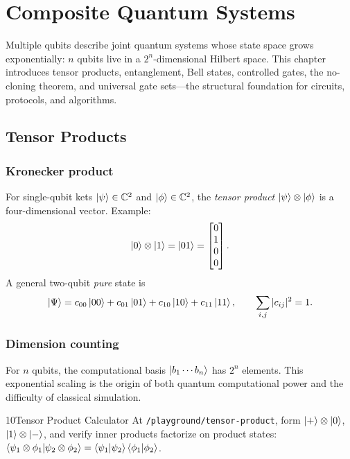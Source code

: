 \chapter{Composite Quantum Systems}
\label{ch:multi}

Multiple qubits describe joint quantum systems whose state space grows exponentially: $n$ qubits live in a $2^n$-dimensional Hilbert space. This chapter introduces tensor products, entanglement, Bell states, controlled gates, the no-cloning theorem, and universal gate sets---the structural foundation for circuits, protocols, and algorithms.

\section{Tensor Products}
\label{sec:tensor}

\subsection{Kronecker product}

For single-qubit kets $\ket{\psi}\in\mathbb{C}^2$ and $\ket{\phi}\in\mathbb{C}^2$, the \emph{tensor product} $\ket{\psi}\otimes\ket{\phi}$ is a four-dimensional vector. Example:
\begin{equation}
\ket{0}\otimes\ket{1}=\ket{01}=\begin{bmatrix}0\\1\\0\\0\end{bmatrix}.
\label{eq:tensor-example}
\end{equation}
A general two-qubit \emph{pure} state is
\begin{equation}
\ket{\Psi}=c_{00}\ket{00}+c_{01}\ket{01}+c_{10}\ket{10}+c_{11}\ket{11},\qquad
\sum_{i,j}|c_{ij}|^2=1.
\label{eq:two-qubit-general}
\end{equation}

\subsection{Dimension counting}

For $n$ qubits, the computational basis $\ket{b_1\cdots b_n}$ has $2^n$ elements. This exponential scaling is the origin of both quantum computational power and the difficulty of classical simulation.

\begin{labbox}{10}{Tensor Product Calculator}
At \texttt{/playground/tensor-product}, form $\ket{+}\otimes\ket{0}$, $\ket{1}\otimes\ket{-}$, and verify inner products factorize on product states: $\braket{\psi_1\otimes\phi_1|\psi_2\otimes\phi_2}=\braket{\psi_1|\psi_2}\braket{\phi_1|\phi_2}$.
\end{labbox}

